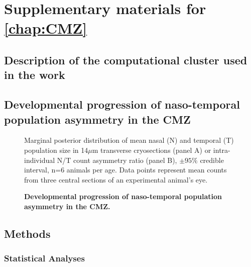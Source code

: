 \chapter{Supplementary materials for \autoref{chap:CMZ}}
\section{Description of the computational cluster used in the work}
\label{cluster}

\section{Developmental progression of naso-temporal population asymmetry in the CMZ}

\begin{figure}[!h]
    \caption{{\bf Developmental progression of naso-temporal population asymmetry in the CMZ.}}
    Marginal posterior distribution of mean nasal (N) and temporal (T) population size in 14$\mu$m transverse cryosections (panel A) or intra-individual N/T count asymmetry ratio (panel B), $\pm 95\%$ credible interval, n=6 animals per age. Data points represent mean counts from three central sections of an experimental animal's eye. 
    \label{NTontology}
\end{figure}


\section{Methods}
\label{ssec:CMZmethods}

\subsection{Statistical Analyses}


